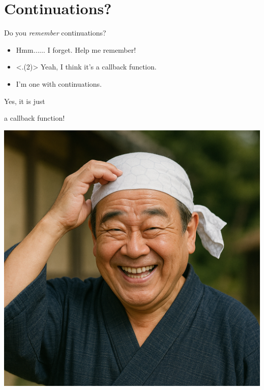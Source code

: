 \section{Continuations?}

\begin{frame}[t]
	\frametitlesec

	Do you \textit{remember} continuations?

	\pause
	\begin{itemize}[<+->]
		\item[\emoji{man-raising-hand}] Hmm$\dots\dots$ I forget. Help me remember!
		\item[\emoji{man-raising-hand}] {\semibf} Yeah, I think it's a callback function.
		\item[\emoji{old-man}] I'm one with continuations.
	\end{itemize}

	\onslide<+->
	\center
	\Large

	\begin{minipage}[c]{.55\linewidth}
		Yes, it is just

		a \textcolor{subhighlight}{callback function}!
	\end{minipage}
	\begin{minipage}[c]{.38\linewidth}
		\includegraphics[height=.5\textheight]{img/ukkari.png}
	\end{minipage}

\end{frame}

